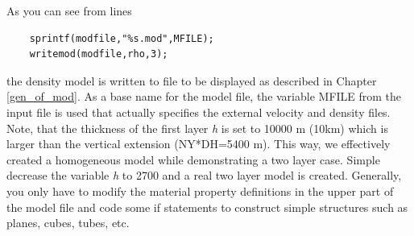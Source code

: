 \documentclass[11pt,onecolumn,oneside]{article}
\begin{document}
As you can see from lines
\begin{verbatim}
	sprintf(modfile,"%s.mod",MFILE);
	writemod(modfile,rho,3);
\end{verbatim}
the density model is written to file to be displayed as described in Chapter \ref{gen_of_mod}. As a base name for the model file, the variable MFILE from the input file is used that actually specifies the external velocity and density files. Note, that the thickness of the first layer \textit{h} is set to 10000 m (10km) which is larger than the vertical extension (NY*DH=5400 m). This way, we effectively created a homogeneous model while demonstrating a two layer case. Simple decrease the variable \textit{h} to 2700 and a real two layer model is created. Generally, you only have to modify the material property definitions in the upper part of the model file and code some if statements to construct simple structures such as planes, cubes, tubes, etc.
\end{document}

